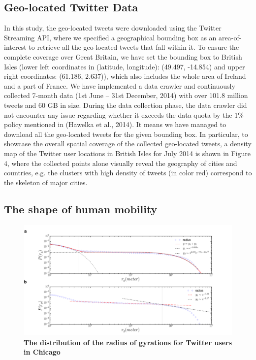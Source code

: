 \documentclass[fleqn,10pt]{wlscirep}
\begin{document}
\subsection*{Geo-located Twitter Data}
In this study, the geo-located tweets were downloaded using the Twitter Streaming API, where we specified a geographical bounding box as an area-of-interest to retrieve all the geo-located tweets that fall within it.
To ensure the complete coverage over Great Britain, we have set the bounding box to British Isles (lower left coordinates in (latitude, longitude): (49.497, -14.854) and upper right coordinates: (61.186, 2.637)), which also includes the whole area of Ireland and a part of France.
We have implemented a data crawler and continuously collected 7-month data (1st June – 31st December, 2014) with over 101.8 million tweets and 60 GB in size.
During the data collection phase, the data crawler did not encounter any issue regarding whether it exceeds the data quota by the 1$\%$ policy mentioned in (Hawelka et al., 2014).
It means we have managed to download all the geo-located tweets for the given bounding box.
In particular, to showcase the overall spatial coverage of the collected geo-located tweets, a density map of the Twitter user locations in British Isles for July 2014 is shown in Figure 4, where the collected points alone visually reveal the geography of cities and countries, e.g. the clusters with high density of tweets (in color red) correspond to the skeleton of major cities.
  
\subsection*{The shape of human mobility}


\begin{figure}[ht]
	\includegraphics[width=1.0\linewidth]{./figure/gyration_chicago}
	\caption{{\bf The distribution of the radius of gyrations for Twitter users in Chicago}}
	\label{Fig_gyration}
\end{figure}
\end{document}
